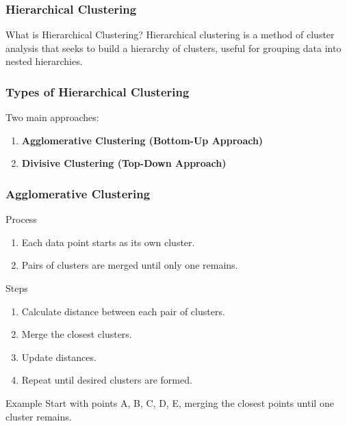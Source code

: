 \documentclass{beamer}
\begin{document}
\begin{frame}[fragile]
    \frametitle{Hierarchical Clustering}
    \begin{block}{What is Hierarchical Clustering?}
        Hierarchical clustering is a method of cluster analysis that seeks to build a hierarchy of clusters, useful for grouping data into nested hierarchies.
    \end{block}
\end{frame}

\begin{frame}[fragile]
    \frametitle{Types of Hierarchical Clustering}
    Two main approaches:
    \begin{enumerate}
        \item \textbf{Agglomerative Clustering (Bottom-Up Approach)}
        \item \textbf{Divisive Clustering (Top-Down Approach)}
    \end{enumerate}
\end{frame}

\begin{frame}[fragile]
    \frametitle{Agglomerative Clustering}
    \begin{block}{Process}
        \begin{enumerate}
            \item Each data point starts as its own cluster.
            \item Pairs of clusters are merged until only one remains.
        \end{enumerate}
    \end{block}
    
    \begin{block}{Steps}
        \begin{enumerate}
            \item Calculate distance between each pair of clusters.
            \item Merge the closest clusters.
            \item Update distances.
            \item Repeat until desired clusters are formed.
        \end{enumerate}
    \end{block}
    
    \begin{block}{Example}
        Start with points A, B, C, D, E, merging the closest points until one cluster remains.
    \end{block}
\end{frame}
\end{document}
